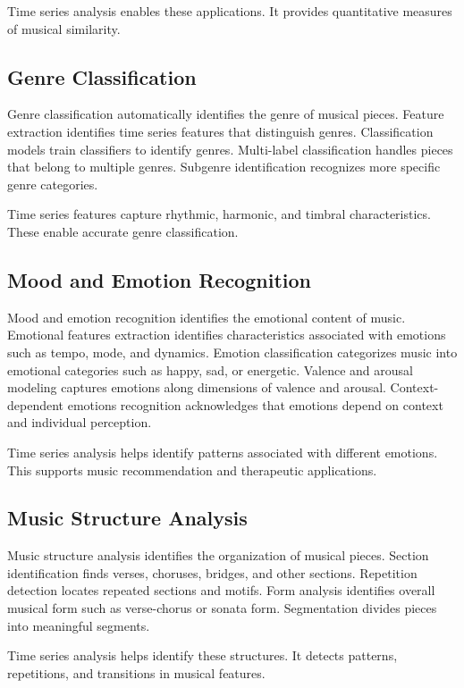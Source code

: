 Time series analysis enables these applications. It provides quantitative measures of musical similarity.

\subsection{Genre Classification}

Genre classification automatically identifies the genre of musical pieces. Feature extraction identifies time series features that distinguish genres. Classification models train classifiers to identify genres. Multi-label classification handles pieces that belong to multiple genres. Subgenre identification recognizes more specific genre categories.

Time series features capture rhythmic, harmonic, and timbral characteristics. These enable accurate genre classification.

\subsection{Mood and Emotion Recognition}

Mood and emotion recognition identifies the emotional content of music. Emotional features extraction identifies characteristics associated with emotions such as tempo, mode, and dynamics. Emotion classification categorizes music into emotional categories such as happy, sad, or energetic. Valence and arousal modeling captures emotions along dimensions of valence and arousal. Context-dependent emotions recognition acknowledges that emotions depend on context and individual perception.

Time series analysis helps identify patterns associated with different emotions. This supports music recommendation and therapeutic applications.

\subsection{Music Structure Analysis}

Music structure analysis identifies the organization of musical pieces. Section identification finds verses, choruses, bridges, and other sections. Repetition detection locates repeated sections and motifs. Form analysis identifies overall musical form such as verse-chorus or sonata form. Segmentation divides pieces into meaningful segments.

Time series analysis helps identify these structures. It detects patterns, repetitions, and transitions in musical features.

